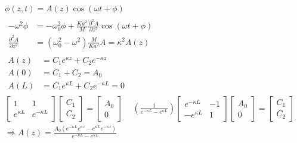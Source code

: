 \documentclass[twoside,10pt]{amsart}
\begin{document}
\[
\begin{gathered}
  \phi(z,t) = A(z) \cos{ (\omega t + \phi ) } \\
  \begin{aligned}
    -\omega^2 \phi & = - \omega_0^2 \phi + \frac{Ka^2}{M} \frac{ \partial^2 A}{ \partial z^2 } \cos{ (\omega t + \phi) } \\
    \frac{ \partial^2 A}{ \partial z^2 } & = (\omega_0^2 - \omega^2 ) \frac{M}{ Ka^2 } A = \kappa^2 A(z)
    \end{aligned} \\
  \begin{aligned}
    A(z) & = C_1 e^{\kappa z} + C_2 e^{-\kappa z } \\
    A(0) & = C_1 + C_2 = A_0 \\
    A(L) & = C_1 e^{ \kappa L } + C_2 e^{-\kappa L } = 0 
  \end{aligned} \\
\left[ \begin{matrix} 1 & 1 \\ e^{\kappa L} & e^{-\kappa L} \end{matrix} \right]\left[ \begin{matrix} C_1 \\ C_2 \end{matrix} \right] = \left[ \begin{matrix} A_0 \\ 0 \end{matrix} \right] \quad \, \left( \frac{1}{ e^{-\kappa L} - e^{\kappa L} } \right) \left[ \begin{matrix} e^{-\kappa L} & -1 \\ -e^{\kappa L} & 1 \end{matrix} \right] \left[ \begin{matrix} A_0 \\ 0 \end{matrix} \right] = \left[ \begin{matrix} C_1 \\ C_2 \end{matrix} \right] \\
\Longrightarrow A(z) = \frac{ A_0 (e^{-\kappa L} e^{\kappa z} -e^{\kappa L} e^{-\kappa z } ) }{ e^{-\kappa L} - e^{\kappa L} } 
\end{gathered}
\]
\end{document}
